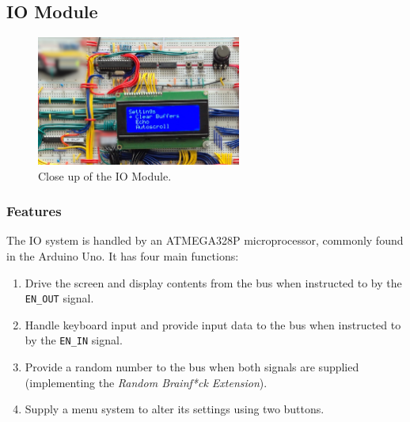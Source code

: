\newpage\subsection{IO Module} \label{sec:implementation:io}
\begin{figure}[H]
  \centering
  \includegraphics[width=0.6\textwidth]{img/iomodulecloseup}
  \caption{Close up of the IO Module.}
  \label{fig:iomodulecloseup}
\end{figure}

\subsubsection{Features}
The IO system is handled by an ATMEGA328P microprocessor, commonly found in the Arduino Uno. It has four main functions:
\begin{enumerate}
\item Drive the screen and display contents from the bus when instructed to by the \texttt{EN\_OUT} signal.
\item Handle keyboard input and provide input data to the bus when instructed to by the \texttt{EN\_IN} signal.
\item Provide a random number to the bus when both signals are supplied (implementing the \emph{Random Brainf*ck Extension}).
\item Supply a menu system to alter its settings using two buttons.
\end{enumerate}

